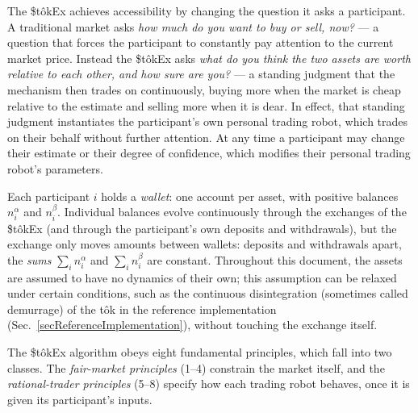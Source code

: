 \documentclass[letterpaper]{article}
\newcommand{\StokEx}{\$t\^{o}kEx}
\begin{document}
The \StokEx{} achieves accessibility by changing the question it asks a participant.
A traditional market asks \emph{how much do you want to buy or sell, now?}
--- a question that forces the participant to constantly pay attention to the current market price.
Instead the \StokEx{} asks
\emph{what do you think the two assets are worth relative to each other, and how sure are you?}
--- a standing judgment that the mechanism then trades on continuously,
buying more when the market is cheap relative to the estimate and selling more when it is dear.
In effect, that standing judgment instantiates the participant's own personal trading robot,
which trades on their behalf without further attention.
At any time a participant may change their estimate or their degree of confidence,
which modifies their personal trading robot's parameters.

Each participant $i$ holds a \emph{wallet}: one account per asset, with positive balances $n^\alpha_i$ and $n^\beta_i$.
Individual balances evolve continuously through the exchanges of the \StokEx{}
(and through the participant's own deposits and withdrawals),
but the exchange only moves amounts between wallets:
deposits and withdrawals apart, the \emph{sums} $\sum_i n^\alpha_i$ and $\sum_i n^\beta_i$ are constant.
Throughout this document, the assets are assumed to have no dynamics of their own;
this assumption can be relaxed under certain conditions,
such as the continuous disintegration (sometimes called demurrage) of the t\^{o}k
in the reference implementation (Sec.~\ref{secReferenceImplementation}), without touching the exchange itself.

The \StokEx{} algorithm obeys eight fundamental principles, which fall into two classes.
The \emph{fair-market principles} (1--4) constrain the market itself,
and the \emph{rational-trader principles} (5--8)
specify how each trading robot behaves, once it is given its participant's inputs.
\end{document}
